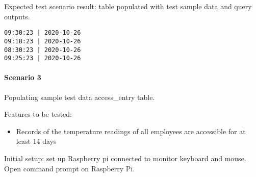 \noindent
Expected test scenario result: table populated with test sample data and query
outputs.

\begin{listing}[H]
\begin{verbatim}
09:30:23 | 2020-10-26
09:18:23 | 2020-10-26
08:30:23 | 2020-10-26
09:25:23 | 2020-10-26
\end{verbatim}
\end{listing}

\paragraph{Scenario 3}
Populating sample test data access\_entry table.

\noindent
Features to be tested:
\begin{itemize}
    \item Records of the temperature readings of all employees are accessible
          for at least 14 days
\end{itemize}

\noindent
Initial setup: set up Raspberry pi connected to monitor keyboard and mouse.
Open command prompt on Raspberry Pi.

